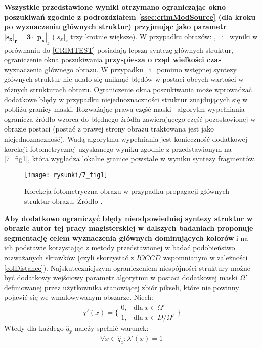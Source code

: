 \documentclass[12pt, twoside, openany]{report}
\theoremstyle{definition}
\begin{document}
\textbf{Wszystkie przedstawione wyniki otrzymano ograniczając okno poszukiwań zgodnie z podrozdziałem \ref{ssec:crimModSource} (dla kroku po wyznaczeniu głównych struktur) przyjmując jako parametr} $\mathbf{|s_x|_r = 3 \cdot 	|p_x|_r}$ ($|s_x|_r$ trzy krotnie większe). W przypadku obrazów: \ObrVIm , \ObrXVIIm \ i \ObrXIXm \ wyniki w porównaniu do \autoref{CRIMTEST} posiadają lepszą syntezę głównych struktur, ograniczenie okna poszukiwania \textbf{przyspiesza o rząd wielkości czas} wyznaczenia głównego obrazu. W przypadku \ObrXVm \ i \ObrXIIIm \ pomimo wstępnej syntezy głównych struktur nie udało się uniknąć błędów w postaci obcych wartości w różnych strukturach obrazu. Ograniczenie okna poszukiwania może wprowadzać dodatkowe błędy w przypadku niejednoznaczności struktur znajdujących się w pobliżu granicy maski. Rozważając prawą część maski \ObrXVIIm \ algorytm wypełniania ogranicza źródło wzorca do błędnego źródła zawierającego część pozostawionej w obrazie postaci (postać z prawej strony obrazu traktowana jest jako niejednoznaczność). Wadą algorytmu wypełniania jest konieczność dodatkowej korekcji fotometrycznej uzyskanego wyniku zgodnie z \cite{StructurePropagationManual} przedstawionym na \autoref{7_fig1}, która wygładza lokalne granice powstałe w wyniku syntezy fragmentów. 
\begin{figure}[!h]
	\centering
	\texttt{[image: rysunki/7\_fig1]}
	\caption{Korekcja fotometryczna obrazu w przypadku propagacji głównych struktur obrazu. Źródło \cite{StructurePropagationManual}.}
	\label{7_fig1} 
\end{figure}
\textbf{Aby dodatkowo ograniczyć błędy nieodpowiedniej syntezy struktur w obrazie autor tej pracy magisterskiej w dalszych badaniach proponuje segmentację celem wyznaczenia głównych dominujących kolorów} i na ich podstawie korzystając z metody przedstawionej w \cite{chen2005adaptive} badać podobieństwo rozważanych skrawków (czyli skorzystać z $IOCCD$ wspomnianym w zależności \eqref{colDistance}).
Najskuteczniejszym ograniczeniem niespójności struktury możne być dodatkowy wejściowy parametr algorytmu w postaci dodatkowej maski $\Omega '$ definiowanej przez użytkownika stanowiącej zbiór pikseli, które nie powinny pojawić się we wmalowywanym obszarze. Niech:
\begin{equation}
\chi' \left(x\right)=\Bigg\{ \begin{array}{ll}
0, & \text{dla} \ x \in \Omega' \\ 
1, & \text{dla} \ x \in D/ \Omega' \end{array}
\Bigg\}
\end{equation}
Wtedy dla każdego $\hat{q}_{\hat{x}}$ należy spełnić warunek:
\begin{align}
\forall x \in \hat{q}_{\hat{x}} : {\lambda }'(x) = 1
\end{align}
\end{document}
